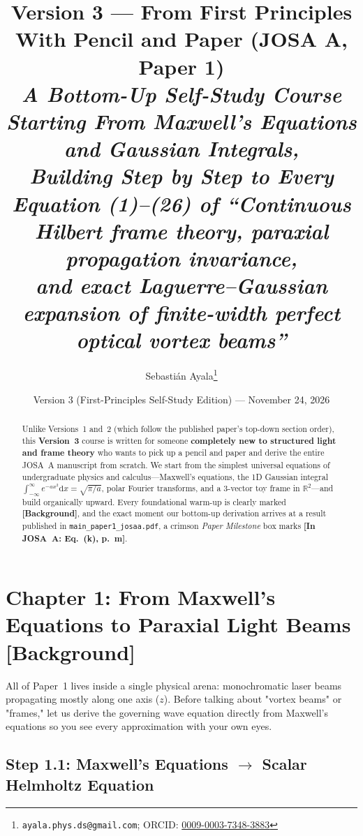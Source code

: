\documentclass[10pt,letterpaper]{article}
\title{\vspace{-1.0cm}\textbf{\Large Version 3 --- From First Principles With Pencil and Paper (JOSA A, Paper 1)}\\[0.35em]
\large\textit{A Bottom-Up Self-Study Course Starting From Maxwell's Equations and Gaussian Integrals,\\
Building Step by Step to Every Equation (1)--(26) of ``Continuous Hilbert frame theory, paraxial propagation invariance,\\
and exact Laguerre--Gaussian expansion of finite-width perfect optical vortex beams''}}
\author{Sebasti\'an Ayala\thanks{\texttt{ayala.phys.ds@gmail.com}; ORCID: \href{https://orcid.org/0009-0003-7348-3883}{0009-0003-7348-3883}}}
\date{Version 3 (First-Principles Self-Study Edition) --- November 24, 2026}
\newcommand{\dd}{\mathrm{d}}
\newcommand{\inpaper}[1]{\textcolor{crimsonborder}{\textbf{[In JOSA~A: #1]}}}
\newcommand{\bgtag}{\textcolor{tealborder}{\textbf{[Background]}}}
\numberwithin{equation}{section}
\begin{document}
\maketitle
\thispagestyle{plain}

\begin{abstract}
\noindent Unlike Versions~1 and~2 (which follow the published paper's top-down section order), this \textbf{Version~3} course is written for someone \textbf{completely new to structured light and frame theory} who wants to pick up a pencil and paper and derive the entire JOSA~A manuscript from scratch. We start from the simplest universal equations of undergraduate physics and calculus---Maxwell's equations, the 1D Gaussian integral $\int_{-\infty}^\infty e^{-ax^2}\dd x = \sqrt{\pi/a}$, polar Fourier transforms, and a 3-vector toy frame in $\mathbb{R}^2$---and build organically upward. Every foundational warm-up is clearly marked \bgtag{}, and the exact moment our bottom-up derivation arrives at a result published in \texttt{main\_paper1\_josaa.pdf}, a crimson \emph{Paper Milestone} box marks \inpaper{Eq.~(k), p.~m}.
\end{abstract}

\tableofcontents
\vspace{0.5em}

\section{Chapter 1: From Maxwell's Equations to Paraxial Light Beams \bgtag{}}
\label{sec:c1}

\begin{whystep}
All of Paper~1 lives inside a single physical arena: monochromatic laser beams propagating mostly along one axis ($z$). Before talking about "vortex beams" or "frames," let us derive the governing wave equation directly from Maxwell's equations so you see every approximation with your own eyes.
\end{whystep}

\subsection{Step 1.1: Maxwell's Equations $\to$ Scalar Helmholtz Equation}
\end{document}
